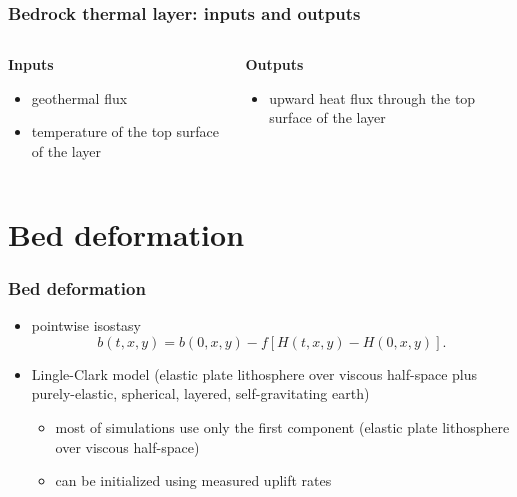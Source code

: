 \documentclass[hide notes,intlimits]{beamer}
\begin{document}

\begin{frame}
  \frametitle{Bedrock thermal layer: inputs and outputs}

  \begin{columns}[t]
    \begin{column}{0.5\linewidth}
      \textbf{Inputs}

      \begin{itemize}
      \item geothermal flux
      \item temperature of the top surface of the layer
      \end{itemize}
    \end{column}
    \begin{column}{0.5\linewidth}
      \textbf{Outputs}

      \begin{itemize}
      \item upward heat flux through the top surface of the layer
      \end{itemize}
    \end{column}
  \end{columns}
\end{frame}

\section{Bed deformation}
\label{sec:bed-deformation}

\begin{frame}
  \frametitle{Bed deformation}

  \begin{itemize}
  \item pointwise isostasy
    \begin{equation*}
      \label{eq:9}
      b(t,x,y) = b(0,x,y) - f \left[H(t,x,y) - H(0,x,y)\right].
    \end{equation*}
  \item Lingle-Clark model (elastic plate lithosphere over viscous
    half-space plus purely-elastic, spherical, layered,
    self-gravitating earth)

    \begin{itemize}
    \item most of simulations use only the first component (elastic
      plate lithosphere over viscous half-space)
    \item can be initialized using measured uplift rates
    \end{itemize}
  \end{itemize}
\end{frame}
\end{document}
